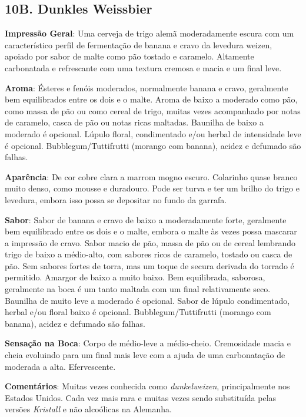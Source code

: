 \subsection*{10B. Dunkles Weissbier}
\textbf{Impressão Geral}: Uma cerveja de trigo alemã moderadamente escura com um característico perfil de fermentação de banana e cravo da levedura weizen, apoiado por sabor de malte como pão tostado e caramelo. Altamente carbonatada e refrescante com uma textura cremosa e macia e um final leve.

\textbf{Aroma}: Ésteres e fenóis moderados, normalmente banana e cravo, geralmente bem equilibrados entre os dois e o malte. Aroma de baixo a moderado como pão, como massa de pão ou como cereal de trigo, muitas vezes acompanhado por notas de caramelo, casca de pão ou notas ricas maltadas. Baunilha de baixo a moderado é opcional. Lúpulo floral, condimentado e/ou herbal de intensidade leve é opcional. Bubblegum/Tuttifrutti (morango com banana), acidez e defumado são falhas.

\textbf{Aparência}: De cor cobre clara a marrom mogno escuro. Colarinho quase branco muito denso, como mousse e duradouro. Pode ser turva e ter um brilho do trigo e levedura, embora isso possa se depositar no fundo da garrafa.

\textbf{Sabor}: Sabor de banana e cravo de baixo a moderadamente forte, geralmente bem equilibrado entre os dois e o malte, embora o malte às vezes possa mascarar a impressão de cravo. Sabor macio de pão, massa de pão ou de cereal lembrando trigo de baixo a médio-alto, com sabores ricos de caramelo, tostado ou casca de pão. Sem sabores fortes de torra, mas um toque de secura derivada do torrado é permitido. Amargor de baixo a muito baixo. Bem equilibrada, saborosa, geralmente na boca é um tanto maltada com um final relativamente seco. Baunilha de muito leve a moderado é opcional. Sabor de lúpulo condimentado, herbal e/ou floral baixo é opcional. Bubblegum/Tuttifrutti (morango com banana), acidez e defumado são falhas.

\textbf{Sensação na Boca}: Corpo de médio-leve a médio-cheio. Cremosidade macia e cheia evoluindo para um final mais leve com a ajuda de uma carbonatação de moderada a alta. Efervescente.

\textbf{Comentários}: Muitas vezes conhecida como \textit{dunkelweizen}, principalmente nos Estados Unidos. Cada vez mais rara e muitas vezes sendo substituída pelas versões \textit{Kristall} e não alcoólicas na Alemanha.

